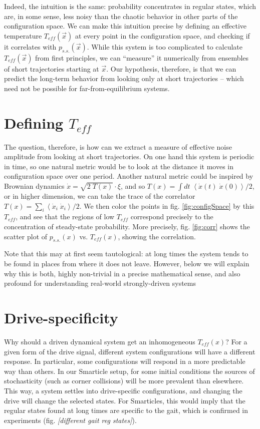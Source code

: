 \documentclass[11pt]{article}
\renewcommand{\v}[1]{\ensuremath{\vec{#1}}} %
\renewcommand{\=}[1]{\stackrel{#1}{=}} %
\renewcommand{\(}{\left (}
\renewcommand{\)}{\right  )}
\renewcommand{\[}{\left [}
\renewcommand{\]}{\right ]}
\newcommand{\<}{\left <}
\renewcommand{\>}{\right >}
\theoremstyle{definition}
\theoremstyle{remark}
\renewcommand{\todo}[1]{\textit{\color{red}[#1]}}
\begin{document}
Indeed, the intuition is the same: probability concentrates in regular states, which are, in some sense, less noisy than the chaotic behavior in other parts of the configuration space. We can make this intuition precise by defining an effective temperature $ T_{eff}(\v{x}) $ at every point in the configuration space, and checking if it correlates with $ p_{s.s.}(\v{x}) $. While this system is too complicated to calculate $ T_{eff} (\v{x})$ from first principles, we can ``measure'' it numerically from ensembles of short trajectories starting at $ \v{x} $. Our hypothesis, therefore, is that we can predict the long-term behavior from looking only at short trajectories -- which need not be possible for far-from-equilibrium systems. 

\section{Defining $ T_{eff} $}
The question, therefore, is how can we extract a measure of effective noise amplitude from looking at short trajectories. On one hand this system is periodic in time, so one natural metric would be to look at the distance it moves in configuration space over one period. Another natural metric could be inspired by Brownian dynamics $ \dot{x}=\sqrt{2\;T(x)}\cdot\xi $, and so $ T(x)=\int dt\;\<\dot{x}(t)\;\dot{x}(0)\>/2 $, or in higher dimension, we can take the trace of the correlator $ T(x)=\sum_i\<\dot{x}_i\;\dot{x}_i\>/2 $. 
We then color the points in fig. \ref{fig:configSpace} by this $ T_{eff} $, and see that the regions of low $ T_{eff} $ correspond precisely to the concentration of steady-state probability. More precisely, fig. \ref{fig:corr} shows the scatter plot of $ p_{s.s.}(x) $ vs. $ T_{eff}(x) $, showing the correlation.

Note that this may at first seem tautological: at long times the system tends to be found in places from where it does not leave. However, below we will explain why this is both, highly non-trivial in a precise mathematical sense, and also profound for understanding real-world strongly-driven systems 

\section{Drive-specificity}
Why should a driven dynamical system get an inhomogeneous $ T_{eff}(x) $? For a given form of the drive signal, different system configurations will have a different response. In particular, some configurations will respond in a more predictable way than others. In our Smarticle setup, for some initial conditions the sources of stochasticity (such as corner collisions) will be more prevalent than elsewhere. This way, a system settles into drive-specific configurations, and changing the drive will change the selected states. For Smarticles, this would imply that the regular states found at long times are specific to the gait, which is confirmed in experiments (fig. \todo{different gait reg states}). 
\end{document}
